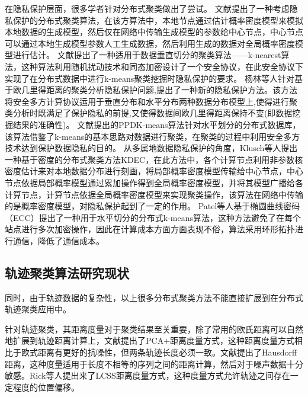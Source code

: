 在隐私保护层面，很多学者针对分布式聚类做出了尝试。
文献\cite{merugu2003privacy}提出了一种考虑隐私保护的分布式聚类算法，在该方算法中，本地节点通过估计概率密度模型来模拟本地数据的生成模型，然后仅在网络中传输生成模型的参数给中心节点，中心节点可以通过本地生成模型参数人工生成数据，然后利用生成的数据对全局概率密度模型进行估计。
文献\cite{张国荣2007分布式环境下保持隐私的聚类挖掘算法}提出了一种适用于数据垂直切分的聚类算法——k-nearest算法，这种算法利用随机扰动技术和同态加密设计了一个安全协议，在此安全协议下实现了在分布式数据中进行k-means聚类挖掘时隐私保护的要求。
杨林等人针对基于欧几里得距离的聚类分析隐私保护问题,提出了一种新的隐私保护方法。该方法将安全多方计算协议运用于垂直分布和水平分布两种数据分布模型上,使得进行聚类分析时既满足了保护隐私的前提,又使得数据间欧几里得距离保持不变(即数据挖掘结果的准确性)。
文献\cite{姚瑶一种基于隐私保护的分布式聚类算法}提出的PPDK-means算法针对水平划分的分布式数据库，该算法借鉴了k-means的基本思路对数据进行聚类，在聚类的过程中利用安全多方技术达到保护数据隐私的目的。
从多属地数据隐私保护的角度，Klusch等人提出一种基于密度的分布式聚类方法KDEC，在此方法中，各个计算节点利用非参数核密度估计来对本地数据分布进行刻画，将局部概率密度模型传输给中心节点，中心节点依据局部概率模型通过累加操作得到全局概率密度模型，并将其模型广播给各计算节点，计算节点依据全局概率密度模型来实现聚类操作，该算法在网络中传输的是概率密度模型，对隐私保护起到了一定的作用。
Patel等人基于椭圆曲线密码（ECC）提出了一种用于水平切分的分布式k-means算法，这种方法避免了在每个站点进行多次加密操作，因此在计算成本方面方面表现不俗，算法采用环形拓扑进行通信，降低了通信成本。


\subsection{轨迹聚类算法研究现状}
同时，由于轨迹数据的复杂性，以上很多分布式聚类方法不能直接扩展到在分布式轨迹聚类应用中。

针对轨迹聚类，其距离度量对于聚类结果至关重要，除了常用的欧氏距离可以自然地扩展到轨迹距离计算上，文献提出了PCA+距离度量方式，这种距离度量方式相比于欧式距离有更好的抗噪性，但两条轨迹长度必须一致。文献提出了Hausdorff距离，这种度量适用于长度不相等的序列之间的距离计算，然后对于噪声数据十分敏感。Rick等人提出来了LCSS距离度量方式，这种度量方式允许轨迹之间存在一定程度的位置偏移。

